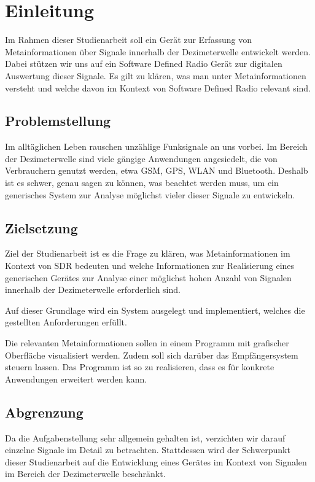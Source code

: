 
\chapter{Einleitung}
Im Rahmen dieser Studienarbeit soll ein Gerät zur Erfassung von Metainformationen über Signale innerhalb der Dezimeterwelle entwickelt werden. Dabei stützen wir uns auf ein Software Defined Radio Gerät zur digitalen Auswertung dieser Signale.
Es gilt zu klären, was man unter Metainformationen versteht und welche davon im Kontext von Software Defined Radio relevant sind.

\section{Problemstellung}
Im alltäglichen Leben rauschen unzählige Funksignale an uns vorbei. Im Bereich der Dezimeterwelle sind viele gängige Anwendungen angesiedelt, die von Verbrauchern genutzt werden, etwa GSM, GPS, WLAN und Bluetooth. 
Deshalb ist es schwer, genau sagen zu können, was beachtet werden muss, um ein generisches System zur Analyse möglichst vieler dieser Signale zu entwickeln.


\section{Zielsetzung}
Ziel der Studienarbeit ist es die Frage zu klären, was Metainformationen im Kontext von \ac{SDR} bedeuten und welche Informationen zur Realisierung eines generischen Gerätes zur Analyse einer möglichst hohen Anzahl von Signalen innerhalb der Dezimeterwelle erforderlich sind.

Auf dieser Grundlage wird ein System ausgelegt und implementiert, welches die gestellten Anforderungen erfüllt.

Die relevanten Metainformationen sollen in einem Programm mit grafischer Oberfläche visualisiert werden. Zudem soll sich darüber das Empfängersystem steuern lassen. Das Programm ist so zu realisieren, dass es für konkrete Anwendungen erweitert werden kann.


\section{Abgrenzung}
Da die Aufgabenstellung sehr allgemein gehalten ist, verzichten wir darauf einzelne Signale im Detail zu betrachten.
Stattdessen wird der Schwerpunkt dieser Studienarbeit auf die Entwicklung eines Gerätes im Kontext von Signalen im Bereich der Dezimeterwelle beschränkt.


